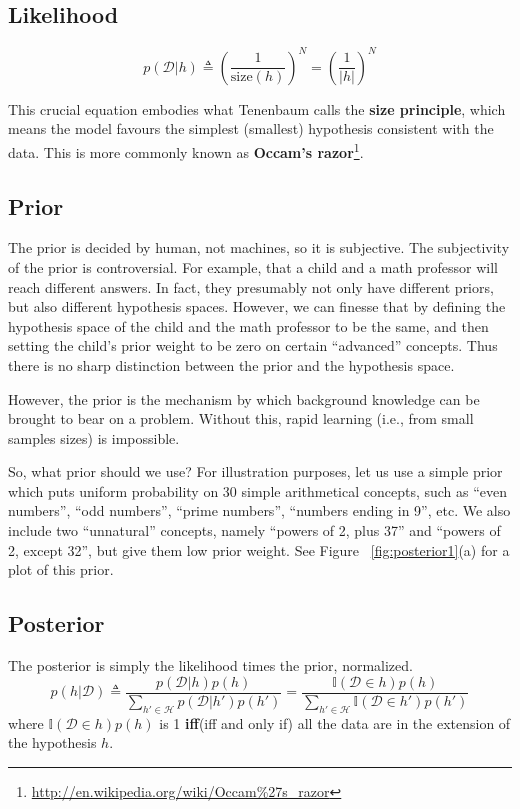 \subsection{Likelihood}
\begin{equation}
p(\mathcal{D}|h) \triangleq \left(\dfrac{1}{\text{size}(h)}\right)^N=\left(\dfrac{1}{|h|}\right)^N
\end{equation}

This crucial equation embodies what Tenenbaum calls the \textbf{size principle}, which means the model favours the simplest (smallest) hypothesis consistent with the data. This is more commonly known as \textbf{Occam’s razor}\footnote{\url{http://en.wikipedia.org/wiki/Occam\%27s_razor}}.


\subsection{Prior}
The prior is decided by human, not machines, so it is subjective. The subjectivity of the prior is controversial. For example, that a child and a math professor will reach different answers. In fact, they presumably not only have different priors, but also different hypothesis spaces. However, we can finesse that by defining the hypothesis space of the child and the math professor to be the same, and then setting the child’s prior weight to be zero on certain “advanced” concepts. Thus there is no sharp distinction between the prior and the hypothesis space.

However, the prior is the mechanism by which background knowledge can be brought to bear on a problem. Without this, rapid learning (i.e., from small samples sizes) is impossible.

So, what prior should we use? For illustration purposes, let us use a simple prior which puts uniform probability on 30 simple arithmetical concepts, such as “even numbers”, “odd numbers”, “prime numbers”, “numbers ending in 9”, etc. We also include two “unnatural” concepts, namely “powers of 2, plus 37” and “powers of 2, except 32”, but give them low prior weight. See Figure ~\ref{fig:posterior1}(a) for a plot of this prior. 


\subsection{Posterior}
The posterior is simply the likelihood times the prior, normalized.
\begin{equation}
p(h|\mathcal{D}) \triangleq \dfrac{p(\mathcal{D}|h)p(h)}{\sum_{h' \in \mathcal{H}}p(\mathcal{D}|h')p(h')}=\dfrac{\mathbb{I}(\mathcal{D} \in h)p(h)}{\sum_{h' \in \mathcal{H}}\mathbb{I}(\mathcal{D} \in h')p(h')}
\end{equation}
where $\mathbb{I}(\mathcal{D} \in h)p(h)$ is 1 \textbf{iff}(iff and only if) all the data are in the extension of the hypothesis $h$.

